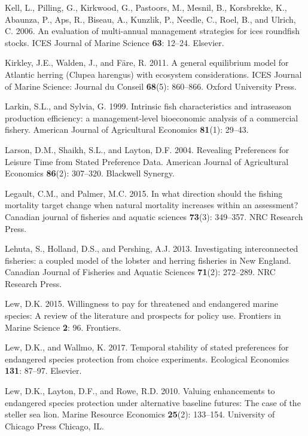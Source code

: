 \documentclass[]{article}
\begin{document}
\hypertarget{ref-Kell2006}{}
Kell, L., Pilling, G., Kirkwood, G., Pastoors, M., Mesnil, B.,
Korsbrekke, K., Abaunza, P., Aps, R., Biseau, A., Kunzlik, P., Needle,
C., Roel, B., and Ulrich, C. 2006. An evaluation of multi-annual
management strategies for ices roundfish stocks. ICES Journal of Marine
Science \textbf{63}: 12--24. Elsevier.

\hypertarget{ref-Kirkley2011AConsiderations}{}
Kirkley, J.E., Walden, J., and Färe, R. 2011. A general equilibrium
model for Atlantic herring (Clupea harengus) with ecosystem
considerations. ICES Journal of Marine Science: Journal du Conseil
\textbf{68}(5): 860--866. Oxford University Press.

\hypertarget{ref-Larkin1999IntrinsicFishery}{}
Larkin, S.L., and Sylvia, G. 1999. Intrinsic fish characteristics and
intraseason production efficiency: a management-level bioeconomic
analysis of a commercial fishery. American Journal of Agricultural
Economics \textbf{81}(1): 29--43.

\hypertarget{ref-Larson2004RevealingData}{}
Larson, D.M., Shaikh, S.L., and Layton, D.F. 2004. Revealing Preferences
for Leisure Time from Stated Preference Data. American Journal of
Agricultural Economics \textbf{86}(2): 307--320. Blackwell Synergy.

\hypertarget{ref-legault2015direction}{}
Legault, C.M., and Palmer, M.C. 2015. In what direction should the
fishing mortality target change when natural mortality increases within
an assessment? Canadian journal of fisheries and aquatic sciences
\textbf{73}(3): 349--357. NRC Research Press.

\hypertarget{ref-Lehuta2013InvestigatingEngland}{}
Lehuta, S., Holland, D.S., and Pershing, A.J. 2013. Investigating
interconnected fisheries: a coupled model of the lobster and herring
fisheries in New England. Canadian Journal of Fisheries and Aquatic
Sciences \textbf{71}(2): 272--289. NRC Research Press.

\hypertarget{ref-lew2015willingness}{}
Lew, D.K. 2015. Willingness to pay for threatened and endangered marine
species: A review of the literature and prospects for policy use.
Frontiers in Marine Science \textbf{2}: 96. Frontiers.

\hypertarget{ref-lew2017temporal}{}
Lew, D.K., and Wallmo, K. 2017. Temporal stability of stated preferences
for endangered species protection from choice experiments. Ecological
Economics \textbf{131}: 87--97. Elsevier.

\hypertarget{ref-lew2010valuing}{}
Lew, D.K., Layton, D.F., and Rowe, R.D. 2010. Valuing enhancements to
endangered species protection under alternative baseline futures: The
case of the steller sea lion. Marine Resource Economics \textbf{25}(2):
133--154. University of Chicago Press Chicago, IL.
\end{document}
